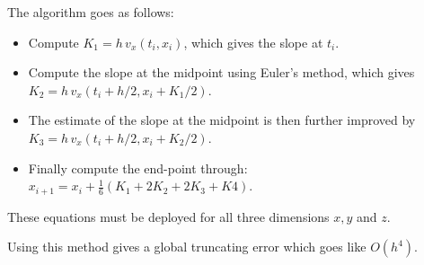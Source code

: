 \documentclass{article}
\begin{document}
\begin{multicols}{2}
The algorithm goes as follows:

\begin{itemize}
	\item Compute $K_1 = h \, v_x(t_i,x_i)$, which gives the slope at $t_i$.
	\item Compute the slope at the midpoint using Euler's method, which gives $K_2 = h \, v_x(t_i + h/2, x_i + K_1/2)$.
	\item The estimate of the slope at the midpoint is then further improved by $K_3 = h \, v_x(t_i + h/2, x_i + K_2/2)$.
	\item Finally compute the end-point through: \\ $x_{i+1} = x_i + \frac{1}{6}(K_1 + 2K_2 + 2K_3 + K4)$.
\end{itemize}
These equations must be deployed for all three dimensions $x,y$ and $z$.

Using this method gives a global truncating error which goes like $O(h^4)$. 



\end{multicols}
\end{document}
